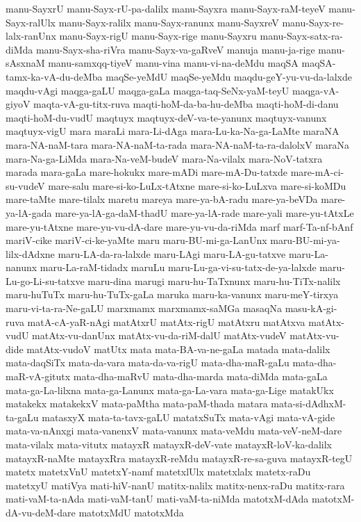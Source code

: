 {manu-SayxrU
manu-Sayx-rU-pa-dalilx
manu-Sayxra
manu-Sayx-raM-teyeV
manu-Sayx-ralUlx
manu-Sayx-ralilx
manu-Sayx-ranunx
manu-SayxreV
manu-Sayx-re-lalx-ranUnx
manu-Sayx-rigU
manu-Sayx-rige
manu-Sayxru
manu-Sayx-satx-ra-diMda
manu-Sayx-sha-riVra
manu-Sayx-va-gaRveV
manuja
manu-ja-rige
manu-sAsxnaM
manu-samxqq-tiyeV
manu-vina
manu-vi-na-deMdu
maqSA
maqSA-tamx-ka-vA-du-deMba
maqSe-yeMdU
maqSe-yeMdu
maqdu-geY-yu-vu-da-lalxde
maqdu-vAgi
maqga-gaLU
maqga-gaLa
maqga-taq-SeNx-yaM-teyU
maqga-vA-giyoV
maqta-vA-gu-titx-ruva
maqti-hoM-da-ba-hu-deMba
maqti-hoM-di-danu
maqti-hoM-du-vudU
maqtuyx
maqtuyx-deV-va-te-yanunx
maqtuyx-vanunx
maqtuyx-vigU
mara
maraLi
mara-Li-dAga
mara-Lu-ka-Na-ga-LaMte
maraNA
mara-NA-naM-tara
mara-NA-naM-ta-rada
mara-NA-naM-ta-ra-dalolxV
maraNa
mara-Na-ga-LiMda
mara-Na-veM-budeV
mara-Na-vilalx
mara-NoV-tatxra
marada
mara-gaLa
mare-hokukx
mare-mADi
mare-mA-Du-tatxde
mare-mA-ci-su-vudeV
mare-salu
mare-si-ko-LuLx-tAtxne
mare-si-ko-LuLxva
mare-si-koMDu
mare-taMte
mare-tilalx
maretu
mareya
mare-ya-bA-radu
mare-ya-beVDa
mare-ya-lA-gada
mare-ya-lA-ga-daM-thadU
mare-ya-lA-rade
mare-yali
mare-yu-tAtxLe
mare-yu-tAtxne
mare-yu-vu-dA-dare
mare-yu-vu-da-riMda
marf
marf-Ta-nf-bAnf
mariV-cike
mariV-ci-ke-yaMte
maru
maru-BU-mi-ga-LanUnx
maru-BU-mi-ya-lilx-dAdxne
maru-LA-da-ra-lalxde
maru-LAgi
maru-LA-gu-tatxve
maru-La-nanunx
maru-La-raM-tidadx
maruLu
maru-Lu-ga-vi-su-tatx-de-ya-lalxde
maru-Lu-go-Li-su-tatxve
maru-dina
marugi
maru-hu-TaTxnunx
maru-hu-TiTx-nalilx
maru-huTuTx
maru-hu-TuTx-gaLa
maruka
maru-ka-vanunx
maru-meY-tirxya
maru-vi-ta-ra-Ne-gaLU
marxmamx
marxmamx-saMGa
masaqNa
masu-kA-gi-ruva
matA-cA-yaR-nAgi
matAtxrU
matAtx-rigU
matAtxru
matAtxva
matAtx-vudU
matAtx-vu-danUnx
matAtx-vu-da-riM-dalU
matAtx-vudeV
matAtx-vu-dide
matAtx-vudoV
matUtx
mata
mata-BA-va-ne-gaLa
matada
mata-dalilx
mata-daqSiTx
mata-da-vara
mata-da-va-rigU
mata-dha-maR-gaLu
mata-dha-maR-vA-gitutx
mata-dha-maRvU
mata-dha-marda
mata-diMda
mata-gaLa
mata-ga-La-lilxna
mata-ga-Lanunx
mata-ga-La-vara
mata-ga-Lige
matakUkx
matakekx
matakekxV
mata-paMtha
mata-paM-thada
matara
mata-si-dAdhxM-ta-gaLu
matasxyX
mata-ta-tavx-gaLU
matatxSuTx
mata-vAgi
mata-vA-gide
mata-va-nAnxgi
mata-vanenxV
mata-vanunx
mata-veMdu
mata-veV-neM-dare
mata-vilalx
mata-vitutx
matayxR
matayxR-deV-vate
matayxR-loV-ka-dalilx
matayxR-naMte
matayxRra
matayxR-reMdu
matayxR-re-sa-guva
matayxR-tegU
matetx
matetxVnU
matetxY-namf
matetxlUlx
matetxlalx
matetx-raDu
matetxyU
matiVya
mati-hiV-nanU
matitx-nalilx
matitx-nenx-raDu
matitx-rara
mati-vaM-ta-nAda
mati-vaM-tanU
mati-vaM-ta-niMda
matotxM-dAda
matotxM-dA-vu-deM-dare
matotxMdU
matotxMda
}
